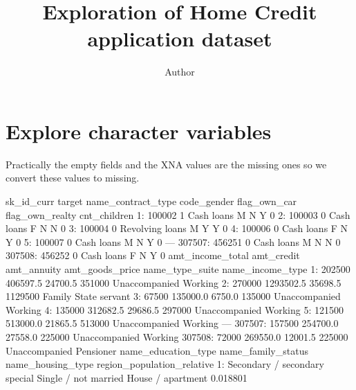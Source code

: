 \documentclass[a4paper]{article}
\title{Exploration of Home Credit application dataset}
\author{Author}
\begin{document}
\maketitle



\section{Explore character variables}
Practically the empty fields and the XNA values are the missing ones so we convert these values to missing.
\begin{Schunk}
\begin{Soutput}
        sk_id_curr target name_contract_type code_gender flag_own_car flag_own_realty cnt_children
     1:     100002      1         Cash loans           M            N               Y            0
     2:     100003      0         Cash loans           F            N               N            0
     3:     100004      0    Revolving loans           M            Y               Y            0
     4:     100006      0         Cash loans           F            N               Y            0
     5:     100007      0         Cash loans           M            N               Y            0
    ---                                                                                           
307507:     456251      0         Cash loans           M            N               N            0
307508:     456252      0         Cash loans           F            N               Y            0
        amt_income_total amt_credit amt_annuity amt_goods_price name_type_suite     name_income_type
     1:           202500   406597.5     24700.5          351000   Unaccompanied              Working
     2:           270000  1293502.5     35698.5         1129500          Family        State servant
     3:            67500   135000.0      6750.0          135000   Unaccompanied              Working
     4:           135000   312682.5     29686.5          297000   Unaccompanied              Working
     5:           121500   513000.0     21865.5          513000   Unaccompanied              Working
    ---                                                                                             
307507:           157500   254700.0     27558.0          225000   Unaccompanied              Working
307508:            72000   269550.0     12001.5          225000   Unaccompanied            Pensioner
                  name_education_type   name_family_status name_housing_type region_population_relative
     1: Secondary / secondary special Single / not married House / apartment                   0.018801

\end{Soutput}
\end{Schunk}
\end{document}
